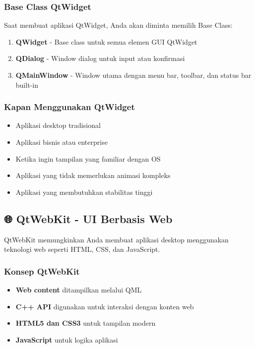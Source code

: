 \subsubsection{Base Class QtWidget}

Saat membuat aplikasi QtWidget, Anda akan diminta memilih Base Class:

\begin{enumerate}
\item \textbf{QWidget} - Base class untuk semua elemen GUI QtWidget
\item \textbf{QDialog} - Window dialog untuk input atau konfirmasi
\item \textbf{QMainWindow} - Window utama dengan menu bar, toolbar, dan status bar built-in
\end{enumerate}

\subsubsection{Kapan Menggunakan QtWidget}

\begin{itemize}
\item Aplikasi desktop tradisional
\item Aplikasi bisnis atau enterprise
\item Ketika ingin tampilan yang familiar dengan OS
\item Aplikasi yang tidak memerlukan animasi kompleks
\item Aplikasi yang membutuhkan stabilitas tinggi
\end{itemize}

\subsection{🌐 QtWebKit - UI Berbasis Web}

QtWebKit memungkinkan Anda membuat aplikasi desktop menggunakan teknologi web seperti HTML, CSS, dan JavaScript.

\subsubsection{Konsep QtWebKit}

\begin{itemize}
\item \textbf{Web content} ditampilkan melalui QML
\item \textbf{C++ API} digunakan untuk interaksi dengan konten web
\item \textbf{HTML5 dan CSS3} untuk tampilan modern
\item \textbf{JavaScript} untuk logika aplikasi
\end{itemize}

